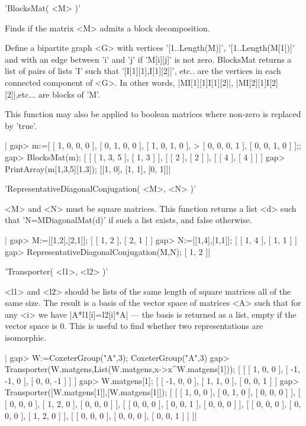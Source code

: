 'BlocksMat( <M> )'

Finds  if the  matrix  <M> admits a block decomposition.

Define    a   bipartite   graph   <G>   with   vertices   '[1..Length(M)]',
'[1..Length(M[1])]'  and with an  edge between 'i'  and 'j' if 'M[i][j]' is
not  zero.  BlocksMat  returns  a  list  of  pairs  of  lists 'I' such that
'[I[1][1],I[1][2]]',  etc.. are the vertices in each connected component of
<G>.  In  other  words, |M{I[1][1]}{I[1][2]}|, |M{I[2][1]}{I[2][2]}|,etc...
are blocks of 'M'.

This  function may  also be  applied to  boolean matrices where non-zero is
replaced by 'true'.

|    gap> m:=[ [ 1, 0, 0, 0 ], [ 0, 1, 0, 0 ], [ 1, 0, 1, 0 ],
    >  [ 0, 0, 0, 1 ], [ 0, 0, 1, 0 ] ];;
    gap> BlocksMat(m);
    [ [ [ 1, 3, 5 ], [ 1, 3 ] ], [ [ 2 ], [ 2 ] ], [ [ 4 ], [ 4 ] ] ]
    gap> PrintArray(m{[1,3,5]}{[1,3]});
    [[1, 0],
     [1, 1],
     [0, 1]]|


'RepresentativeDiagonalConjugation( <M>, <N> )'

<M>  and <N> must be  square matrices. This function  returns a list <d>
such  that  'N=M\^DiagonalMat(d)'  if  such  a  list  exists,  and  false
otherwise.

|    gap> M:=[[1,2],[2,1]];
    [ [ 1, 2 ], [ 2, 1 ] ]
    gap> N:=[[1,4],[1,1]];
    [ [ 1, 4 ], [ 1, 1 ] ]
    gap> RepresentativeDiagonalConjugation(M,N);
    [ 1, 2 ]|


'Transporter( <l1>, <l2> )'

<l1>  and <l2> should be lists of the same length of square matrices all of
the  same size. The result  is a basis of  the vector space of matrices <A>
such  that for any <i> we have  |A*l1[i]=l2[i]*A| --- the basis is returned
as  a list, empty if the vector space  is 0. This is useful to find whether
two representations are isomorphic.

|    gap> W:=CoxeterGroup("A",3);
    CoxeterGroup("A",3)
    gap> Transporter(W.matgens,List(W.matgens,x->x^W.matgens[1]));
    [ [ [ 1, 0, 0 ], [ -1, -1, 0 ], [ 0, 0, -1 ] ] ]
    gap> W.matgens[1];
    [ [ -1, 0, 0 ], [ 1, 1, 0 ], [ 0, 0, 1 ] ]
    gap> Transporter([W.matgens[1]],[W.matgens[1]]);
    [ [ [ 1, 0, 0 ], [ 0, 1, 0 ], [ 0, 0, 0 ] ],
      [ [ 0, 0, 0 ], [ 1, 2, 0 ], [ 0, 0, 0 ] ],
      [ [ 0, 0, 0 ], [ 0, 0, 1 ], [ 0, 0, 0 ] ],
      [ [ 0, 0, 0 ], [ 0, 0, 0 ], [ 1, 2, 0 ] ],
      [ [ 0, 0, 0 ], [ 0, 0, 0 ], [ 0, 0, 1 ] ] ]|

